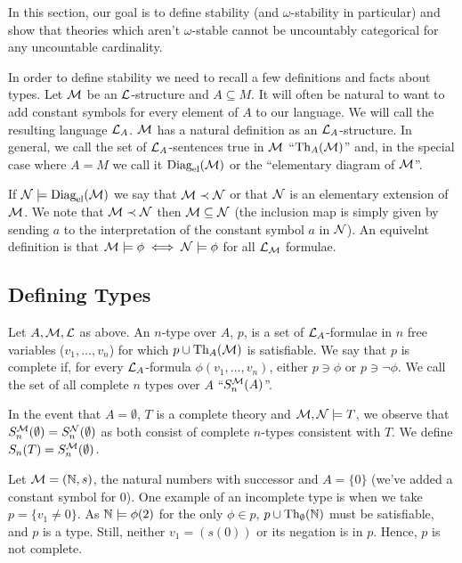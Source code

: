 In this section, our goal is to define stability (and \(\omega\)-stability in particular) and show that theories which aren't \(\omega\)-stable cannot be uncountably categorical for any uncountable cardinality. 

In order to define stability we need to recall a few definitions and facts about types. 
Let \(\mathcal{M}\) be an \(\mathcal{L}\)-structure and \(A \subseteq M\). 
It will often be natural to want to add constant symbols for every element of \(A\) to our language. 
We will call the resulting language \(\mathcal{L}_A\). \(\mathcal{M}\) has a natural definition as an \(\mathcal{L}_A\)-structure. 
In general, we call the set of \(\mathcal{L}_A\)-sentences true in \(\mathcal{M}\) ``\(\text{Th}_A(\mathcal{M})\)'' and, in the special case where \(A = M\) we call it \(\text{Diag}_\text{el}(\mathcal{M})\) or the ``elementary diagram of \(\mathcal{M}\)''. 

If \(\mathcal{N} \models \text{Diag}_\text{el}(\mathcal{M})\) we say that \(\mathcal{M} \prec \mathcal{N}\) or that \(\mathcal{N}\) is an elementary extension of \(\mathcal{M}\). 
We note that \(\mathcal{M} \prec \mathcal{N}\) then \(\mathcal{M} \subseteq \mathcal{N}\) (the inclusion map is simply given by sending \(a\) to the interpretation of the constant symbol \(a\) in \(\mathcal{N}\)).
An equivelnt definition is that \(\mathcal{M} \models \phi \iff \mathcal{N} \models \phi\) for all \(\mathcal{L}_{\mathcal{M}}\) formulae. 

\subsection{Defining Types}

\begin{definition}\label{def_types}
Let \(A, \mathcal{M}, \mathcal{L}\) as above. 
An \(n\)-type over \(A\), \(p\), is a set of \(\mathcal{L}_A\)-formulae in \(n\) free variables (\(v_1, \ldots, v_n\)) for which \(p \cup \text{Th}_A(\mathcal{M})\) is satisfiable.
We say that \(p\) is complete if, for every \(\mathcal{L}_A\)-formula \(\phi(v_1, \ldots, v_n)\), either \(p \ni \phi\) or \(p \ni \neg \phi\). 
We call the set of all complete \(n\) types over \(A\) ``\(S_n^{\mathcal{M}}(A)\)''. 

In the event that \(A = \emptyset\), \(T\) is a complete theory and \(\mathcal{M}, \mathcal{N} \models T\), we observe that \(S_n^{\mathcal{M}}(\emptyset) = S_n^{\mathcal{N}}(\emptyset)\) as both consist of complete \(n\)-types consistent with \(T\). 
We define \(S_n(T) = S_n^{\mathcal{M}}(\emptyset)\).
\end{definition}

\begin{example}\label{example_types_natural_numbers} 
Let \(\mathcal{M} = (\mathbb{N},s)\), the natural numbers with successor and \(A = \{0\}\) (we've added a constant symbol for 0). 
One example of an incomplete type is when we take \(p = \{v_1 \neq 0\}\). 
As \(\mathbb{N} \models \phi(2)\) for the only \(\phi \in p\), \(p \cup \text{Th}_\emptyset(\mathbb{N})\) must be satisfiable, and \(p\) is a type. 
Still, neither \(v_1 = (s(0))\) or its negation is in \(p\).
Hence, \(p\) is not complete. 
\end{example}

